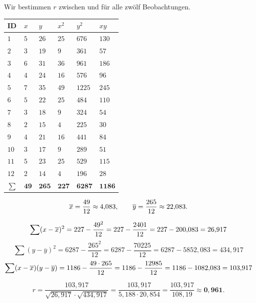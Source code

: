 \begin{merksatz}
Wir bestimmen $r$ zwischen  und  für alle zwölf Beobachtungen.

\begin{center}
{\small
\renewcommand{\arraystretch}{1.28}
\begin{tabular}{@{}P{0.9cm}P{1.1cm}P{1.1cm}P{1.3cm}P{1.3cm}P{1.3cm}@{}}
\toprule
\textbf{ID} & $x$ & $y$ & $x^2$ & $y^2$ & $xy$\\
\midrule
$1$ & $5$ & $26$ & $25$ & $676$ & $130$\\
$2$ & $3$ & $19$ & $9$ & $361$ & $57$\\
$3$ & $6$ & $31$ & $36$ & $961$ & $186$\\
$4$ & $4$ & $24$ & $16$ & $576$ & $96$\\
$5$ & $7$ & $35$ & $49$ & $1225$ & $245$\\
$6$ & $5$ & $22$ & $25$ & $484$ & $110$\\
$7$ & $3$ & $18$ & $9$ & $324$ & $54$\\
$8$ & $2$ & $15$ & $4$ & $225$ & $30$\\
$9$ & $4$ & $21$ & $16$ & $441$ & $84$\\
$10$ & $3$ & $17$ & $9$ & $289$ & $51$\\
$11$ & $5$ & $23$ & $25$ & $529$ & $115$\\
$12$ & $2$ & $14$ & $4$ & $196$ & $28$\\
\midrule
$\sum$ & $\mathbf{49}$ & $\mathbf{265}$ & $\mathbf{227}$ & $\mathbf{6287}$ & $\mathbf{1186}$\\
\bottomrule
\end{tabular}}
\end{center}

\[ \overline{x} = \frac{49}{12} \approx 4{,}083, \qquad \overline y = \frac{265}{12} \approx 22{,}083 . \]

\[ \sum(x-\overline{x})^2 = 227 - \frac{49^2}{12} = 227 - \frac{2401}{12} = 227 - 200{,}083 = 26{,}917 \]
\[ \sum(y-\overline y)^2 = 6287 - \frac{265^2}{12} = 6287 - \frac{70225}{12} = 6287 - 5852{,}083 = 434{,}917 \]
\[ \sum(x-\overline{x})(y-\overline y) = 1186 - \frac{49 \cdot 265}{12} = 1186 - \frac{12985}{12} = 1186 - 1082{,}083 = 103{,}917 \]

\[ r = \frac{103{,}917}{\sqrt{26{,}917}\cdot\sqrt{434{,}917}} = \frac{103{,}917}{5{,}188 \cdot 20{,}854} = \frac{103{,}917}{108{,}19} \approx \mathbf{0{,}961} . \]


\end{merksatz}

